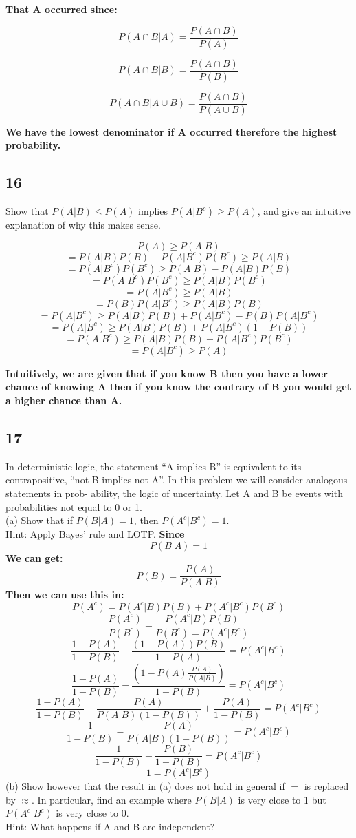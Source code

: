 \documentclass{article}
\begin{document}
\textbf{That A occurred since:}

$$P(A \cap B | A)=\frac{P(A \cap B)}{P(A)}$$

$$P(A \cap B | B)=\frac{P(A \cap B)}{P(B)}$$

$$P(A \cap B | A \cup B)=\frac{P(A \cap B)}{P(A \cup B)}$$

\textbf{We have the lowest denominator if A occurred therefore the highest probability.}

\subsection{16}Show that $P(A|B) \leq P(A)$ implies $P(A|B^c) \geq P(A)$, and give an intuitive explanation of why this makes sense.

$$P(A) \geq P(A|B)$$
$$=P(A|B)P(B)+P(A|B^c)P(B^c)\geq P(A|B)$$
$$=P(A|B^c)P(B^c)\geq P(A|B)-P(A|B)P(B)$$
$$=P(A|B^c)P(B^c) \geq P(A|B)P(B^c)$$
$$=P(A|B^c) \geq P(A|B)$$
$$=P(B)P(A|B^c) \geq P(A|B)P(B)$$
$$=P(A|B^c) \geq P(A|B)P(B)+P(A|B^c)-P(B)P(A|B^c)$$
$$=P(A|B^c) \geq P(A|B)P(B)+P(A|B^c)(1-P(B))$$
$$=P(A|B^c) \geq P(A|B)P(B) + P(A|B^c)P(B^c)$$
$$=P(A|B^c)\geq P(A)$$

\textbf{Intuitively, we are given that if you know B then you have a lower chance of knowing A then if you know the contrary of B you would get a higher chance than A.}

\subsection{17}
In deterministic logic, the statement “A implies B” is equivalent to its contrapositive, “not B implies not A”. In this problem we will consider analogous statements in prob- ability, the logic of uncertainty. Let A and B be events with probabilities not equal to 0 or 1.\\
(a) Show that if $P(B|A) = 1$, then $P(A^c|B^c) = 1$.\\ Hint: Apply Bayes’ rule and LOTP.
\textbf{Since}
$$P(B|A)=1$$
\textbf{We can get:}
$$P(B)=\frac{P(A)}{P(A|B)}$$
\textbf{Then we can use this in:}
$$P(A^c)=P(A^c|B)P(B)+P(A^c|B^c)P(B^c)$$
$$\frac{P(A^c)}{P(B^c)}-\frac{P(A^c|B)P(B)}{P(B^c)=P(A^c|B^c)}$$
$$\frac{1-P(A)}{1-P(B)}-\frac{(1-P(A))P(B)}{1-P(A)}=P(A^c|B^c)$$
$$\frac{1-P(A)}{1-P(B)}-\frac{(1-P(A)\frac{P(A)}{P(A|B)})}{1-P(B)}=P(A^c|B^c)$$
$$\frac{1-P(A)}{1-P(B)}-\frac{P(A)}{P(A|B)(1-P(B))}+\frac{P(A)}{1-P(B)}=P(A^c|B^c)$$
$$\frac{1}{1-P(B)}-\frac{P(A)}{P(A|B)(1-P(B))}=P(A^c|B^c)$$
$$\frac{1}{1-P(B)}-\frac{P(B)}{1-P(B)}=P(A^c|B^c)$$
$$1=P(A^c|B^c)$$
(b) Show however that the result in (a) does not hold in general if $=$ is replaced by $\approx$. In particular, find an example where $P(B|A)$ is very close to 1 but $P(A^c|B^c)$ is very close to 0.\\
Hint: What happens if A and B are independent?
\end{document}
